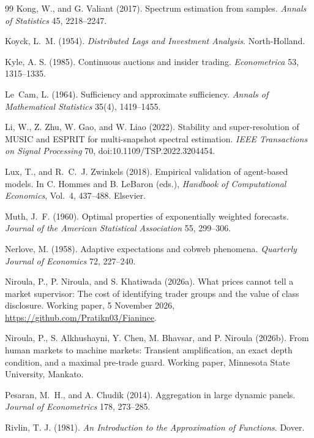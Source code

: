 \documentclass[12pt]{article}
\theoremstyle{definition}
\theoremstyle{remark}
\begin{document}
\begin{thebibliography}{99}
 Kong, W., and G. Valiant (2017). Spectrum estimation from samples. \emph{Annals of Statistics} 45, 2218--2247.

 Koyck, L.~M. (1954). \emph{Distributed Lags and Investment Analysis}. North-Holland.

 Kyle, A. S. (1985). Continuous auctions and insider trading. \emph{Econometrica} 53, 1315--1335.

 Le~Cam, L. (1964). Sufficiency and approximate sufficiency. \emph{Annals of Mathematical Statistics} 35(4), 1419--1455.

 Li, W., Z. Zhu, W. Gao, and W. Liao (2022). Stability and super-resolution of MUSIC and ESPRIT for multi-snapshot spectral estimation. \emph{IEEE Transactions on Signal Processing} 70, doi:10.1109/TSP.2022.3204454.

 Lux, T., and R.~C.~J. Zwinkels (2018). Empirical validation of agent-based models. In C. Hommes and B. LeBaron (eds.), \emph{Handbook of Computational Economics}, Vol.~4, 437--488. Elsevier.

 Muth, J.~F. (1960). Optimal properties of exponentially weighted forecasts. \emph{Journal of the American Statistical Association} 55, 299--306.

 Nerlove, M. (1958). Adaptive expectations and cobweb phenomena. \emph{Quarterly Journal of Economics} 72, 227--240.

 Niroula, P., P. Niroula, and S. Khatiwada (2026a). What prices cannot tell a market supervisor: The cost of identifying trader groups and the value of class disclosure. Working paper, 5 November 2026, \url{https://github.com/Pratikn03/Fianince}.

 Niroula, P., S. Alkhushayni, Y. Chen, M. Bhavsar, and P. Niroula (2026b). From human markets to machine markets: Transient amplification, an exact depth condition, and a maximal pre-trade guard. Working paper, Minnesota State University, Mankato.

 Pesaran, M.~H., and A. Chudik (2014). Aggregation in large dynamic panels. \emph{Journal of Econometrics} 178, 273--285.

 Rivlin, T. J. (1981). \emph{An Introduction to the Approximation of Functions}. Dover.


\end{thebibliography}
\end{document}
